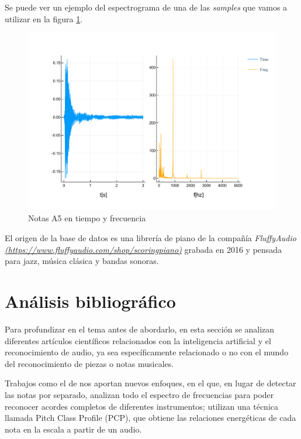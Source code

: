 \documentclass[12pt]{article}
\begin{document}
Se puede ver un ejemplo del espectrograma de una de las \textit{samples} que vamos a utilizar en la figura 
\ref{fig:ejemplo_espectrograma}.

\begin{figure}[!ht]
	\centering
	\includegraphics[width=1.0\linewidth]{assets/A5.pdf}
	\caption{Notas A5 en tiempo y frecuencia}
	\label{fig:ejemplo_espectrograma}
\end{figure}

\bigskip
El origen de la base de datos es una librería de piano de la compañía \textit{FluffyAudio} \textit{\url{(https://www.fluffyaudio.com/shop/scoringpiano)}} 
grabada en 2016 y pensada para jazz, música clásica y bandas sonoras.

\section{Análisis bibliográfico}
\label{Análisis bibliográfico}
Para profundizar en el tema antes de abordarlo, en esta sección se analizan diferentes artículos científicos relacionados con la inteligencia
artificial y el reconocimiento de audio, ya sea específicamente relacionado o no con el mundo del reconocimiento de piezas o notas musicales.

\bigskip
Trabajos como el de \cite{osmalsky2012neural} nos aportan nuevos enfoques, 
en el que, en lugar de detectar las notas por separado, analizan todo el espectro de frecuencias para poder reconocer acordes completos de diferentes instrumentos;
utilizan una técnica llamada Pitch Class Profile (PCP), que obtiene las relaciones energéticas de cada nota en la escala a partir de un audio.
\end{document}
